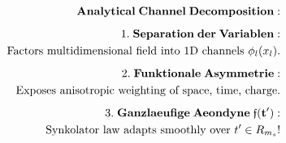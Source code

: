 \documentclass[preview]{standalone}
\begin{document}
\begin{align*}
\special{dvisvgm:raw <g id='unique000'>}\mathbf{Analytical\;Channel\;Decomposition:}\\[5pt]1.\;\mathbf{Separation\;der\;Variablen:}\\\;\;\text{Factors multidimensional field into 1D channels }\phi_l(x_l).\\[5pt]2.\;\mathbf{Funktionale\;Asymmetrie:}\\\;\;\text{Exposes anisotropic weighting of space, time, charge.}\\[5pt]3.\;\mathbf{Ganzlaeufige\;Aeondyne\;\mathfrak{f}(t'):}\\\;\;\text{Synkolator law adapts smoothly over }t'\in R_{m_s}!\special{dvisvgm:raw </g>}
\end{align*}
\end{document}
